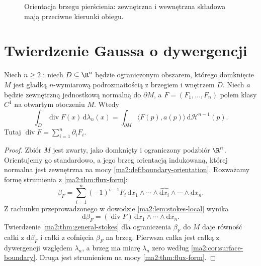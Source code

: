 \begin{figure}[htbp]
\centering
{}
\caption{Orientacja brzegu pierścienia:
zewnętrzna i wewnętrzna składowa mają przeciwne kierunki obiegu.}
\label{ma2:fig:green-annulus}
\end{figure}

\section{Twierdzenie Gaussa o dywergencji}

\begin{twierdzenie}
\label{ma2:thm:gauss-divergence}
Niech $n\ge2$ i niech $D\subseteq\R^n$
będzie ograniczonym obszarem, którego domknięcie
$M$ jest gładką $n$-wymiarową podrozmaitością
z brzegiem i wnętrzem $D$.
Niech $a$ będzie zewnętrzną jednostkową normalną
do $\partial M$, a $F=(F_1,\ldots,F_n)$
polem klasy $C^1$ na otwartym otoczeniu $M$.
Wtedy
\[
 \boxed{\displaystyle
 \int_D\operatorname{div}F(x)\,\mathrm d\lambda_n(x)
 =\int_{\partial M}\langle F(p),a(p)\rangle\,
 \mathrm d\mathcal H^{n-1}(p).}
\]
Tutaj $\operatorname{div}F=\sum_{i=1}^n\partial_i F_i$.
\end{twierdzenie}
\begin{proof}
Zbiór $M$ jest zwarty, jako domknięty i ograniczony
podzbiór $\R^n$. Orientujemy go standardowo, a jego
brzeg orientacją indukowaną, której normalna jest
zewnętrzna na mocy
\ref{ma2:def:boundary-orientation}.
Rozważamy formę strumienia z
\ref{ma2:thm:flux-form}:
\[
 \beta_F=\sum_{i=1}^n(-1)^{i-1}F_i\,
 \mathrm dx_1\wedge\cdots\wedge
 \widehat{\mathrm dx_i}\wedge\cdots\wedge\mathrm dx_n.
\]
Z rachunku przeprowadzonego w dowodzie
\ref{ma2:lem:stokes-local} wynika
\[
 \mathrm d\beta_F=(\operatorname{div}F)\,
 \mathrm dx_1\wedge\cdots\wedge\mathrm dx_n.
\]
Twierdzenie \ref{ma2:thm:general-stokes}
dla ograniczenia $\beta_F$ do $M$ daje
równość całki z $\mathrm d\beta_F$ i całki
z cofnięcia $\beta_F$ na brzeg.
Pierwsza całka jest całką z dywergencji
względem $\lambda_n$, a brzeg ma miarę
$\lambda_n$ zero według
\ref{ma2:cor:surface-boundary}.
Druga jest strumieniem na mocy
\ref{ma2:thm:flux-form}.
\end{proof}


